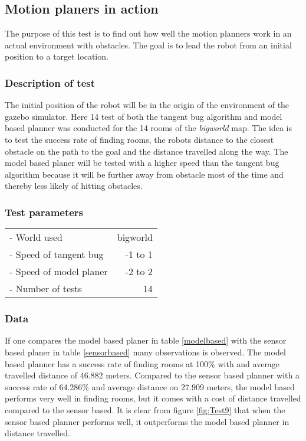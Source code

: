 \documentclass[../Head/Main.tex]{subfiles}
\begin{document}
\subsection{Motion planers in action}
\label{subsec:testMotionPlanning}

The purpose of this test is to find out how well the motion planners work in an actual environment with obstacles. The goal is to lead the robot from an initial position to a target location. 

\subsubsection*{Description of test}

The initial position of the robot will be in the origin of the environment of the gazebo simulator. Here 14 test of both the tangent bug algorithm and model based planner was conducted for the 14 rooms of the \textit{bigworld} map. The idea is to test the success rate of finding rooms, the robots distance to the closest obstacle on the path to the goal and the distance travelled along the way. The model based planer will be tested with a higher speed than the tangent bug algorithm because it will be further away from obstacle most of the time and thereby less likely of hitting obstacles.           

\subsubsection*{Test parameters}

\begin{tabular}{l r}
	- World used                & bigworld\\	
	- Speed of tangent bug      & -1 to 1\\
	- Speed of model planer     & -2 to 2\\
	- Number of tests           & 14
\end{tabular}

\subsubsection*{Data}

If one compares the model based planer in table \ref{modelbased} with the sensor based planer in table \ref{sensorbased} many observations is observed. The model based planner has a success rate of finding rooms at 100\% with and average travelled distance of 46.882 meters. Compared to the sensor based planner with a success rate of 64.286\% and average distance on 27.909 meters, the model based performs very well in finding rooms, but it comes with a cost of distance travelled compared to the sensor based. It is clear from figure \ref{fig:Test9} that when the sensor based planner performs well, it outperforms the model based planner in distance travelled.    
\end{document}
